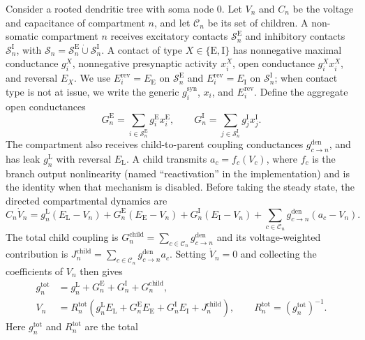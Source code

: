 Consider a rooted dendritic tree with soma node 0. Let $V_n$ and $C_n$ be
the voltage and capacitance of compartment $n$, and let $\mathcal C_n$ be
its set of children. A non-somatic compartment \(n\) receives excitatory contacts \(\mathcal S_n^{\mathrm E}\) and inhibitory
contacts \(\mathcal S_n^{\mathrm I}\), with
\(\mathcal S_n=\mathcal S_n^{\mathrm E}\mathbin{\dot\cup}
\mathcal S_n^{\mathrm I}\). A contact of type
\(X\in\{\mathrm E,\mathrm I\}\) has nonnegative maximal conductance \(g_i^X\),
nonnegative presynaptic activity \(x_i^X\), open conductance \(g_i^Xx_i^X\),
and reversal \(E_X\). We use
\(E_i^{\mathrm{rev}}=E_{\mathrm E}\) on
\(\mathcal S_n^{\mathrm E}\) and
\(E_i^{\mathrm{rev}}=E_{\mathrm I}\) on
\(\mathcal S_n^{\mathrm I}\); when contact type is not at issue, we write the
generic \(g_i^{\mathrm{syn}}\), \(x_i\), and \(E_i^{\mathrm{rev}}\).
Define the aggregate open conductances
\[
G_n^{\mathrm E}=\sum_{i\in\mathcal S_n^{\mathrm E}}g_i^{\mathrm E}x_i^{\mathrm E},
\qquad
G_n^{\mathrm I}=\sum_{j\in\mathcal S_n^{\mathrm I}}g_j^{\mathrm I}x_j^{\mathrm I}.
\]
The compartment also receives child-to-parent coupling conductances
\(g_{c\to n}^{\mathrm{den}}\), and has leak \(g_n^{\mathrm L}\) with reversal
\(E_{\mathrm L}\). A child
transmits $a_c=f_c(V_c)$, where $f_c$ is the branch output nonlinearity
(named ``reactivation'' in the implementation) and is the identity when that
mechanism is disabled. Before taking the steady state, the directed
compartmental dynamics are
\begin{equation}
C_n\dot V_n
=g_n^{\mathrm L}(E_{\mathrm L}-V_n)
+G_n^{\mathrm E}(E_{\mathrm E}-V_n)
+G_n^{\mathrm I}(E_{\mathrm I}-V_n)
+\sum_{c\in\mathcal C_n}g_{c\to n}^{\mathrm{den}}(a_c-V_n).
\label{eq:s_current_balance}
\end{equation}
The total child coupling is
\(G_n^{\mathrm{child}}=\sum_{c\in\mathcal C_n}g_{c\to n}^{\mathrm{den}}\)
and its voltage-weighted contribution is
\(J_n^{\mathrm{child}}=\sum_{c\in\mathcal C_n}g_{c\to n}^{\mathrm{den}}a_c\).
Setting $\dot V_n=0$ and collecting the coefficients of $V_n$ then gives
\begin{align}
g_n^{\mathrm{tot}}
&=g_n^{\mathrm L}+G_n^{\mathrm E}+G_n^{\mathrm I}
  +G_n^{\mathrm{child}},\\
V_n
&=R_n^{\mathrm{tot}}
\left(g_n^{\mathrm L}E_{\mathrm L}
+G_n^{\mathrm E}E_{\mathrm E}
+G_n^{\mathrm I}E_{\mathrm I}
+J_n^{\mathrm{child}}\right),
\qquad R_n^{\mathrm{tot}}=(g_n^{\mathrm{tot}})^{-1}.
\label{eq:s_voltage}
\end{align}
Here $g_n^{\mathrm{tot}}$ and $R_n^{\mathrm{tot}}$ are the total
